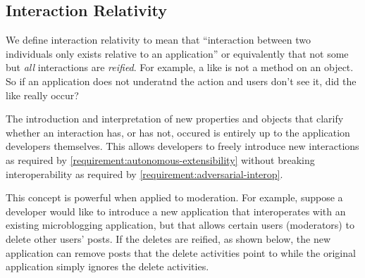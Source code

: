 
\subsection{Interaction Relativity}
\label{concepts:interaction-relativity}

We define interaction relativity to mean that ``interaction between two individuals only
exists relative to an application'' or equivalently that not some but \emph{all} interactions
are \emph{reified}.
For example, a like is not a method on an object.
So if an application does not underatnd the action and users don't see it, did the like really occur?



The introduction and interpretation of new properties and objects
that clarify whether an interaction has, or has not, occured
is entirely up to the application developers themselves.
This allows developers to freely introduce new interactions
as required by \ref{requirement:autonomous-extensibility} without
breaking interoperability as required by \ref{requirement:adversarial-interop}.

This concept is powerful when applied to moderation.
For example, suppose a developer would like to introduce a new application
that interoperates with an existing microblogging application,
but that allows certain users (moderators) to delete other users' posts.
If the deletes are reified, as shown below, the new application
can remove posts that the delete activities point to while the original
application simply ignores the delete activities.

